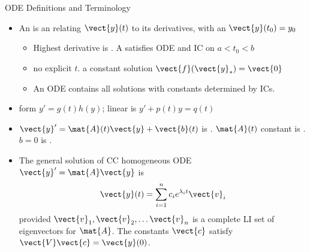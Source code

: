 \begin{frame}{ODE Definitions and Terminology}
\begin{itemize}
  \item An  is an  relating $\vect{y}(t)$ to its derivatives, with an  $\vect{y}(t_0)=y_0$
  \begin{itemize}
    \item Highest derivative is . A  satisfies ODE and IC on $a<t_0<b$
    \item {} no explicit $t$.  a constant solution $\vect{f}(\vect{y}_*)=\vect{0}$
    \item An ODE  contains all solutions with constants determined by ICs.
  \end{itemize}
  \item {} form $y'=g(t)h(y)$; linear  is $y'+p(t)y=q(t)$
  \item  $\vect{y}'=\mat{A}(t)\vect{y}+\vect{b}(t)$
  is .
  \newline
  $\mat{A}(t)$ constant is .
  $b=0$ is . 

    \item The general solution of CC homogeneous ODE $\vect{y}'=\mat{A}\vect{y}$
    is
    \[  
    \vect{y}(t)=\sum_{i=1}^n c_i e^{\lambda_i t}\vect{v}_i
    \]
    provided $\vect{v}_1, \vect{v}_2,\ldots \vect{v}_n$ is 
    a complete LI set of eigenvectors for $\mat{A}$. 
    \newline The constants 
     $\vect{c}$ satisfy $\vect{V}\vect{c}=\vect{y}(0)$.   
\end{itemize}
\end{frame}
